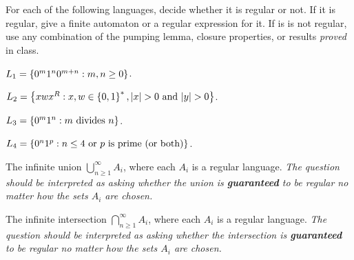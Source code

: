 \begin{problem}
  For each of the following languages, decide whether it is regular
  or not. If it is regular, give a finite automaton or a regular expression for it.
  If is is not regular, use any combination of
  the pumping lemma, closure properties, or results \emph{proved} in class.

  \begin{enumalph}
    \item $L_1 = \left\{0^m 1^n 0^{m + n} : m, n \geq 0\right\}$.
    \item $L_2 = \left\{xwx^R : x, w \in \left\{0, 1\right\}^*, \lvert x\rvert > 0 \text{ and } \lvert y\rvert > 0\right\}$.
    \item $L_3 = \left\{0^m 1^n : m \text{ divides } n\right\}$.
    \item $L_4 = \left\{0^n 1^p : n \le 4 \text{ or $p$ is prime (or both)}\right\}$.
    \item The infinite union $\bigcup_{n \geq 1}^\infty A_i$, where each $A_i$
      is a regular language.
      \emph{
        The question should be interpreted as asking
        whether the union is \textbf{guaranteed} to be regular
        no matter how the sets $A_i$ are chosen.
      }
    \item The infinite intersection $\bigcap_{n \geq 1}^\infty A_i$, where each $A_i$
      is a regular language.
      \emph{
        The question should be interpreted as asking
        whether the intersection is \textbf{guaranteed} to be regular
        no matter how the sets $A_i$ are chosen.
      }
  \end{enumalph}

\end{problem}

